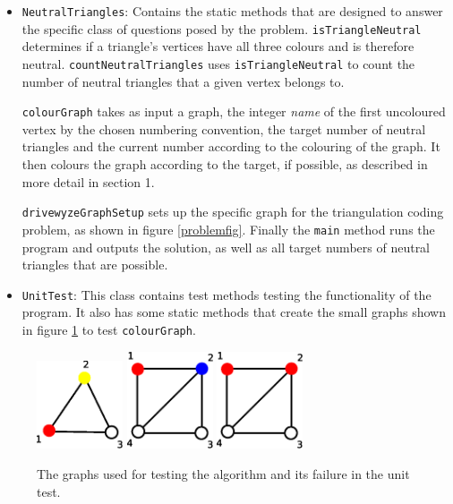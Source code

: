 \documentclass[letterpaper,10pt]{article}
\def\code#1{\texttt{#1}}
\begin{document}
\begin{itemize}
 \item \code{NeutralTriangles}: Contains the static methods that are designed to answer the specific class of questions posed by the problem.
 \code{isTriangleNeutral} determines if a triangle's vertices have all three colours and is therefore neutral.  \code{countNeutralTriangles} uses 
 \code{isTriangleNeutral} to count the number of neutral triangles that a given vertex belongs to.  
 
 \code{colourGraph} takes as input a graph, 
 the integer \textit{name} of the first uncoloured vertex by the chosen numbering convention, the target number of neutral triangles and the current 
 number according to the colouring of the graph.  It then colours the graph according to the target, if possible, as described in more detail in 
 section 1.
 
 \code{drivewyzeGraphSetup} sets up the specific graph for the triangulation coding problem, as shown in figure \ref{problemfig}.  Finally 
the \code{main} method runs the program and outputs the solution, as well as all target numbers of 
neutral triangles that are possible.

\item \code{UnitTest}:  This class contains  test methods testing the functionality of the program.  It also has some static methods that create 
the small graphs shown in figure \ref{test1} to test \code{colourGraph}.

\end{itemize}


\begin{figure}
\begin{center}
  \includegraphics[width=1in]{triangle.eps}
  \qquad
  \includegraphics[width=1in]{square1.eps}
  \qquad
  \includegraphics[width=1in]{square2.eps}  
\end{center}
  \caption{
The graphs used for testing the algorithm and its failure in the unit test.} \label{test1}
\end{figure}
\end{document}
